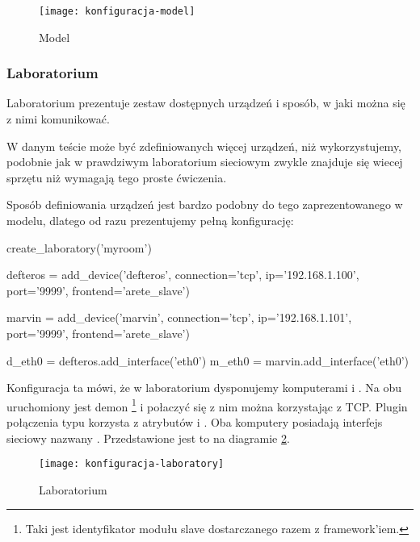 \documentclass[00-praca-magisterska.tex]{subfiles}
\begin{document}
\begin{figure}[htb]
\begin{center}
\leavevmode
\texttt{[image: konfiguracja-model]}
\end{center}
\caption{Model}
\label{fig:konfiguracja-model}
\end{figure}

\subsubsection{Laboratorium}

Laboratorium prezentuje zestaw dostępnych urządzeń i sposób, w jaki można się
z nimi komunikować.

W danym teście może być zdefiniowanych więcej urządzeń, niż wykorzystujemy, podobnie
jak w prawdziwym laboratorium sieciowym zwykle znajduje się wiecej sprzętu niż
wymagają tego proste ćwiczenia.

Sposób definiowania urządzeń jest bardzo podobny do tego zaprezentowanego w
modelu, dlatego od razu prezentujemy pełną konfigurację:

\begin{pythoncode}
  create_laboratory('myroom')

  defteros = add_device('defteros',
      connection='tcp',
      ip='192.168.1.100',
      port='9999',
      frontend='arete_slave')

  marvin = add_device('marvin',
      connection='tcp',
      ip='192.168.1.101',
      port='9999',
      frontend='arete_slave')

  d_eth0 = defteros.add_interface('eth0')
  m_eth0 = marvin.add_interface('eth0')
\end{pythoncode}

Konfiguracja ta mówi, że w laboratorium  dysponujemy komputerami
 i . Na obu uruchomiony jest demon
\footnote{Taki jest identyfikator modułu slave dostarczanego
razem z framework'iem.} i połaczyć się z nim można korzystając z TCP. Plugin
połączenia typu  korzysta z atrybutów  i . Oba
komputery posiadają interfejs sieciowy nazwany . Przedstawione jest
to na diagramie \ref{fig:konfiguracja-laboratory}.

\begin{figure}[htb]
\begin{center}
\leavevmode
\texttt{[image: konfiguracja-laboratory]}
\end{center}
\caption{Laboratorium}
\label{fig:konfiguracja-laboratory}
\end{figure}
\end{document}

